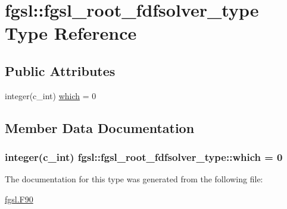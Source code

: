 \hypertarget{structfgsl_1_1fgsl__root__fdfsolver__type}{\section{fgsl\-:\-:fgsl\-\_\-root\-\_\-fdfsolver\-\_\-type Type Reference}
\label{structfgsl_1_1fgsl__root__fdfsolver__type}
}
\subsection*{Public Attributes}
\begin{DoxyCompactItemize}
\item 
integer(c\-\_\-int) \hyperlink{structfgsl_1_1fgsl__root__fdfsolver__type_ac92296a50423bdec1a1cf31422f615ff}{which} = 0
\end{DoxyCompactItemize}


\subsection{Member Data Documentation}
\hypertarget{structfgsl_1_1fgsl__root__fdfsolver__type_ac92296a50423bdec1a1cf31422f615ff}{
\subsubsection[{which}]{\setlength{\rightskip}{0pt plus 5cm}integer(c\-\_\-int) fgsl\-::fgsl\-\_\-root\-\_\-fdfsolver\-\_\-type\-::which = 0}}\label{structfgsl_1_1fgsl__root__fdfsolver__type_ac92296a50423bdec1a1cf31422f615ff}


The documentation for this type was generated from the following file\-:\begin{DoxyCompactItemize}
\item 
\hyperlink{fgsl_8F90}{fgsl.\-F90}\end{DoxyCompactItemize}
